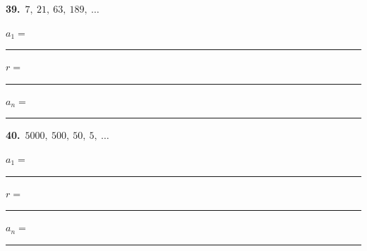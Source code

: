 \documentclass[11pt,letterpaper]{article}
\begin{document}
\needspace{2.0cm}\par\vspace{3mm}\noindent\begin{minipage}[t]{0.48\linewidth}{\color{fmturn}\bfseries 39.}\ $7,\ 21,\ 63,\ 189,\ \ldots$\par\vspace{2mm}\hspace*{4mm}$a_1=$\,\rule{1.2cm}{0.4pt}\quad $r=$\,\rule{1.2cm}{0.4pt}\par\vspace{2.5mm}\hspace*{4mm}$a_n=$\,\rule{3.6cm}{0.4pt}\end{minipage}\hfill\begin{minipage}[t]{0.48\linewidth}{\color{fmturn}\bfseries 40.}\ $5000,\ 500,\ 50,\ 5,\ \ldots$\par\vspace{2mm}\hspace*{4mm}$a_1=$\,\rule{1.2cm}{0.4pt}\quad $r=$\,\rule{1.2cm}{0.4pt}\par\vspace{2.5mm}\hspace*{4mm}$a_n=$\,\rule{3.6cm}{0.4pt}\end{minipage}\par\vspace{1.0cm}
\end{document}
